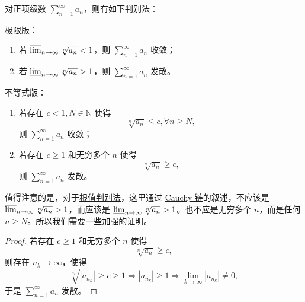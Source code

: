 \documentclass[../../main.tex]{subfiles}
\begin{document}
\begin{theorem}[根值判别法]\label{theorem:级数-根值判别法}
对正项级数 \(\sum_{n=1}^\infty a_n\)，则有如下判别法：

极限版：
\begin{enumerate}
\item 若 \(\varlimsup_{n \to \infty} \sqrt[n]{a_n} < 1\)，则 \(\sum_{n=1}^\infty a_n\) 收敛；

\item 若 \(\varliminf_{n \to \infty} \sqrt[n]{a_n} > 1\)，则 \(\sum_{n=1}^\infty a_n\) 发散。
\end{enumerate}

不等式版：
\begin{enumerate}
\item 若存在 \( c < 1, N \in \mathbb{N} \) 使得
\[
\sqrt[n]{a_n} \leqslant c, \forall n \geqslant N,
\]
则 \(\sum_{n=1}^\infty a_n\) 收敛；

\item 若存在 \( c \geqslant 1 \) 和无穷多个 \( n \) 使得
\[
\sqrt[n]{a_n} \geqslant c,
\]
则 \(\sum_{n=1}^\infty a_n\) 发散。
\end{enumerate}
\end{theorem}
\begin{remark}
值得注意的是，对于\hyperref[theorem:级数-根值判别法]{根值判别法}，这里通过 \hyperref[theorem:Cauchy链]{Cauchy 链}的叙述，不应该是 \(\varlimsup_{n \to \infty} \sqrt[n]{a_n} > 1\)，而应该是 \(\varliminf_{n \to \infty} \sqrt[n]{a_n} > 1\)。也不应是无穷多个 \( n \)，而是任何 \( n \geqslant N \)。所以我们需要一些加强的证明。
\end{remark}
\begin{proof}
若存在 \( c \geqslant 1 \) 和无穷多个 \( n \) 使得
\[
\sqrt[n]{a_n} \geqslant c,
\]
则存在 \( n_k \to \infty \)，使得
\[
\sqrt[n_k]{|a_{n_k}|} \geqslant c \geqslant 1 \Rightarrow |a_{n_k}| \geqslant 1 \Rightarrow \lim_{k \to \infty} |a_{n_k}| \neq 0,
\]
于是 \(\sum_{n=1}^\infty a_n\) 发散。

\end{proof}
 
\end{document}
